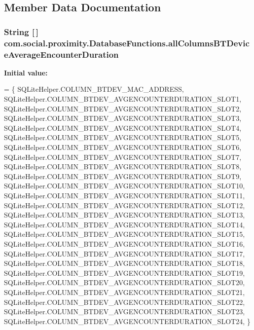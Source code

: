 \subsection{Member Data Documentation}
\hypertarget{classcom_1_1social_1_1proximity_1_1_database_functions_a37740a5005b0a87d33dc3f25f7433474}{}
\subsubsection[{all\+Columns\+B\+T\+Device\+Average\+Encounter\+Duration}]{\setlength{\rightskip}{0pt plus 5cm}String \mbox{[}$\,$\mbox{]} com.\+social.\+proximity.\+Database\+Functions.\+all\+Columns\+B\+T\+Device\+Average\+Encounter\+Duration\hspace{0.3cm}{\ttfamily [private]}}\label{classcom_1_1social_1_1proximity_1_1_database_functions_a37740a5005b0a87d33dc3f25f7433474}
{\bfseries Initial value\+:}
\begin{DoxyCode}
= \{ 
            SQLiteHelper.COLUMN\_BTDEV\_MAC\_ADDRESS,
            SQLiteHelper.COLUMN\_BTDEV\_AVGENCOUNTERDURATION\_SLOT1,
            SQLiteHelper.COLUMN\_BTDEV\_AVGENCOUNTERDURATION\_SLOT2,
            SQLiteHelper.COLUMN\_BTDEV\_AVGENCOUNTERDURATION\_SLOT3,
            SQLiteHelper.COLUMN\_BTDEV\_AVGENCOUNTERDURATION\_SLOT4,
            SQLiteHelper.COLUMN\_BTDEV\_AVGENCOUNTERDURATION\_SLOT5,
            SQLiteHelper.COLUMN\_BTDEV\_AVGENCOUNTERDURATION\_SLOT6,
            SQLiteHelper.COLUMN\_BTDEV\_AVGENCOUNTERDURATION\_SLOT7,
            SQLiteHelper.COLUMN\_BTDEV\_AVGENCOUNTERDURATION\_SLOT8,
            SQLiteHelper.COLUMN\_BTDEV\_AVGENCOUNTERDURATION\_SLOT9,
            SQLiteHelper.COLUMN\_BTDEV\_AVGENCOUNTERDURATION\_SLOT10,
            SQLiteHelper.COLUMN\_BTDEV\_AVGENCOUNTERDURATION\_SLOT11,
            SQLiteHelper.COLUMN\_BTDEV\_AVGENCOUNTERDURATION\_SLOT12,
            SQLiteHelper.COLUMN\_BTDEV\_AVGENCOUNTERDURATION\_SLOT13,
            SQLiteHelper.COLUMN\_BTDEV\_AVGENCOUNTERDURATION\_SLOT14,
            SQLiteHelper.COLUMN\_BTDEV\_AVGENCOUNTERDURATION\_SLOT15,
            SQLiteHelper.COLUMN\_BTDEV\_AVGENCOUNTERDURATION\_SLOT16,
            SQLiteHelper.COLUMN\_BTDEV\_AVGENCOUNTERDURATION\_SLOT17,
            SQLiteHelper.COLUMN\_BTDEV\_AVGENCOUNTERDURATION\_SLOT18,
            SQLiteHelper.COLUMN\_BTDEV\_AVGENCOUNTERDURATION\_SLOT19,
            SQLiteHelper.COLUMN\_BTDEV\_AVGENCOUNTERDURATION\_SLOT20,
            SQLiteHelper.COLUMN\_BTDEV\_AVGENCOUNTERDURATION\_SLOT21,
            SQLiteHelper.COLUMN\_BTDEV\_AVGENCOUNTERDURATION\_SLOT22,
            SQLiteHelper.COLUMN\_BTDEV\_AVGENCOUNTERDURATION\_SLOT23,
            SQLiteHelper.COLUMN\_BTDEV\_AVGENCOUNTERDURATION\_SLOT24,
    \}
\end{DoxyCode}
